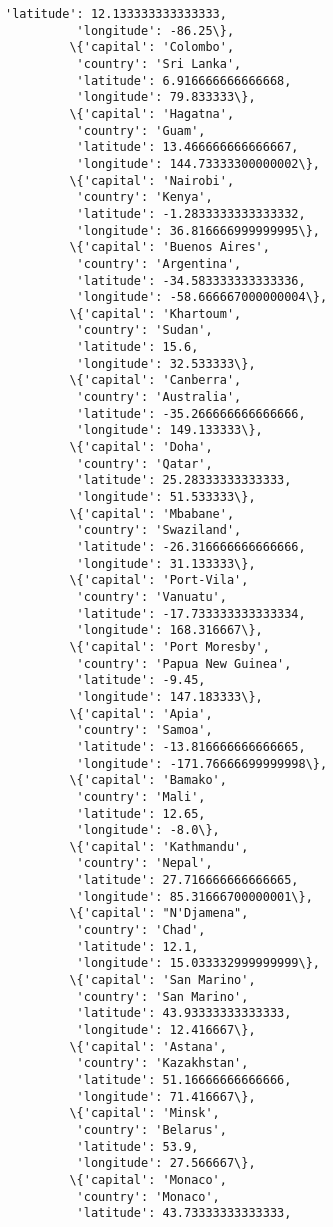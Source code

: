 \documentclass[11pt]{article}
\begin{document}
\begin{Verbatim}[commandchars=\\\{\}]
          'latitude': 12.133333333333333,
          'longitude': -86.25\},
         \{'capital': 'Colombo',
          'country': 'Sri Lanka',
          'latitude': 6.916666666666668,
          'longitude': 79.833333\},
         \{'capital': 'Hagatna',
          'country': 'Guam',
          'latitude': 13.466666666666667,
          'longitude': 144.73333300000002\},
         \{'capital': 'Nairobi',
          'country': 'Kenya',
          'latitude': -1.2833333333333332,
          'longitude': 36.816666999999995\},
         \{'capital': 'Buenos Aires',
          'country': 'Argentina',
          'latitude': -34.583333333333336,
          'longitude': -58.666667000000004\},
         \{'capital': 'Khartoum',
          'country': 'Sudan',
          'latitude': 15.6,
          'longitude': 32.533333\},
         \{'capital': 'Canberra',
          'country': 'Australia',
          'latitude': -35.266666666666666,
          'longitude': 149.133333\},
         \{'capital': 'Doha',
          'country': 'Qatar',
          'latitude': 25.28333333333333,
          'longitude': 51.533333\},
         \{'capital': 'Mbabane',
          'country': 'Swaziland',
          'latitude': -26.316666666666666,
          'longitude': 31.133333\},
         \{'capital': 'Port-Vila',
          'country': 'Vanuatu',
          'latitude': -17.733333333333334,
          'longitude': 168.316667\},
         \{'capital': 'Port Moresby',
          'country': 'Papua New Guinea',
          'latitude': -9.45,
          'longitude': 147.183333\},
         \{'capital': 'Apia',
          'country': 'Samoa',
          'latitude': -13.816666666666665,
          'longitude': -171.76666699999998\},
         \{'capital': 'Bamako',
          'country': 'Mali',
          'latitude': 12.65,
          'longitude': -8.0\},
         \{'capital': 'Kathmandu',
          'country': 'Nepal',
          'latitude': 27.716666666666665,
          'longitude': 85.31666700000001\},
         \{'capital': "N'Djamena",
          'country': 'Chad',
          'latitude': 12.1,
          'longitude': 15.033332999999999\},
         \{'capital': 'San Marino',
          'country': 'San Marino',
          'latitude': 43.93333333333333,
          'longitude': 12.416667\},
         \{'capital': 'Astana',
          'country': 'Kazakhstan',
          'latitude': 51.16666666666666,
          'longitude': 71.416667\},
         \{'capital': 'Minsk',
          'country': 'Belarus',
          'latitude': 53.9,
          'longitude': 27.566667\},
         \{'capital': 'Monaco',
          'country': 'Monaco',
          'latitude': 43.73333333333333,

\end{Verbatim}
\end{document}

